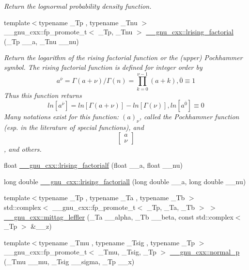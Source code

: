 \begin{DoxyCompactItemize}
\begin{DoxyCompactList}\small\item\em Return the lognormal probability density function. \end{DoxyCompactList}\item 
{\footnotesize template$<$typename \+\_\+\+Tp , typename \+\_\+\+Tnu $>$ }\\\+\_\+\+\_\+gnu\+\_\+cxx\+::fp\+\_\+promote\+\_\+t$<$ \+\_\+\+Tp, \+\_\+\+Tnu $>$ \hyperlink{group__mathsf__gnu_ga8912b75b2f7592fb61128c766e7313b9}{\+\_\+\+\_\+gnu\+\_\+cxx\+::lrising\+\_\+factorial} (\+\_\+\+Tp \+\_\+\+\_\+a, \+\_\+\+Tnu \+\_\+\+\_\+nu)
\begin{DoxyCompactList}\small\item\em Return the logarithm of the rising factorial function or the (upper) Pochhammer symbol. The rising factorial function is defined for integer order by \[ a^{\overline{\nu}} = \Gamma(a + \nu) / \Gamma(n) = \prod_{k=0}^{\nu-1} (a + k), \overline{0} \equiv 1 \] Thus this function returns \[ ln[a^{\overline{\nu}}] = ln[\Gamma(a + \nu)] - ln[\Gamma(\nu)], ln[a^{\overline{0}}] \equiv 0 \] Many notations exist for this function\+: $ (a)_\nu $, called the Pochhammer function (esp. in the literature of special functions), and \[ \left[ \begin{array}{c} a \\ \nu \end{array} \right] \], and others. \end{DoxyCompactList}\item 
float \hyperlink{group__mathsf__gnu_ga68c64f4e44d03b5b3f75f90dbe2e0819}{\+\_\+\+\_\+gnu\+\_\+cxx\+::lrising\+\_\+factorialf} (float \+\_\+\+\_\+a, float \+\_\+\+\_\+nu)
\item 
long double \hyperlink{group__mathsf__gnu_ga1ac811f56f38f7ea7a1e035ec0157f6b}{\+\_\+\+\_\+gnu\+\_\+cxx\+::lrising\+\_\+factoriall} (long double \+\_\+\+\_\+a, long double \+\_\+\+\_\+nu)
\item 
{\footnotesize template$<$typename \+\_\+\+Tp , typename \+\_\+\+Ta , typename \+\_\+\+Tb $>$ }\\std\+::complex$<$ \+\_\+\+\_\+gnu\+\_\+cxx\+::fp\+\_\+promote\+\_\+t$<$ \+\_\+\+Tp, \+\_\+\+Ta, \+\_\+\+Tb $>$ $>$ \hyperlink{group__mathsf__gnu_ga1a51079e00fbe5473d8cf9ad3304c5c6}{\+\_\+\+\_\+gnu\+\_\+cxx\+::mittag\+\_\+leffler} (\+\_\+\+Ta \+\_\+\+\_\+alpha, \+\_\+\+Tb \+\_\+\+\_\+beta, const std\+::complex$<$ \+\_\+\+Tp $>$ \&\+\_\+\+\_\+z)
\item 
{\footnotesize template$<$typename \+\_\+\+Tmu , typename \+\_\+\+Tsig , typename \+\_\+\+Tp $>$ }\\\+\_\+\+\_\+gnu\+\_\+cxx\+::fp\+\_\+promote\+\_\+t$<$ \+\_\+\+Tmu, \+\_\+\+Tsig, \+\_\+\+Tp $>$ \hyperlink{group__mathsf__gnu_gaeb735b0fb98c7684ba61b8940f50193c}{\+\_\+\+\_\+gnu\+\_\+cxx\+::normal\+\_\+p} (\+\_\+\+Tmu \+\_\+\+\_\+mu, \+\_\+\+Tsig \+\_\+\+\_\+sigma, \+\_\+\+Tp \+\_\+\+\_\+x)

\end{DoxyCompactItemize}
